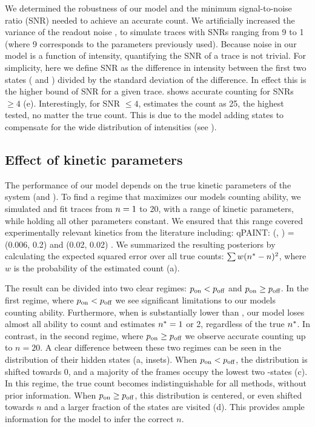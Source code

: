 We determined the robustness of our model and the minimum signal-to-noise ratio 
(SNR) needed to achieve an accurate count.
	We artificially increased the variance of the readout noise \camvar, 
	to simulate traces with SNRs ranging from 9 to 1 (where 9 
	corresponds to the parameters previously used).
	Because noise in our model is a function of intensity, quantifying the SNR of a trace 
	is not trivial. 
	For simplicity, here we define SNR as the difference in intensity between 
	the first two states ( and ) divided by the standard deviation of the difference. 
	In effect this is the higher bound of SNR for a given trace. 
	\ours shows accurate counting for SNRs $\geq 4$ (e). 
	Interestingly, for  SNR $\leq 4$, \ours estimates the count as 25, 
	the highest \n tested, no matter the true count. 
	This is due to the model adding states to compensate for the wide distribution of intensities  
	(see ).

\subsection{Effect of kinetic parameters}
The performance of our model depends on the true kinetic parameters of the system (\pon and \poff).
%
	To find a regime that maximizes our models counting ability, we simulated and fit traces 
	from $n=1$ to 20, with a range of kinetic parameters, 
	while holding all other parameters constant.
	We ensured that this range covered experimentally relevant kinetics from the literature including:
	qPAINT: (\pon, \poff) = (0.006, 0.2) \cite{jungmann_2016} and \lbfcs (0.02, 0.02) \cite{stein_2021}. 
	We summarized the resulting posteriors by calculating the expected squared error over all true counts: 
	$\sum w(n^* - n)^2$, where $w$ is the probability of the estimated count \n 
	(a).

The result can be divided into two clear regimes: $p_\text{on} < p_\text{off}$ and $p_\text{on} \geq p_\text{off}$.
	In the first regime, where $p_\text{on} < p_\text{off}$ we see significant limitations to our models counting ability.
	Furthermore, when \pon is substantially lower than \poff, our model loses almost 
	all ability to count and estimates $n^*=1$ or 2, regardless of the true $n^*$.
	In contrast, in the second regime, where $p_\text{on} \geq p_\text{off}$ we observe 
	accurate counting up to $n=20$.
	A clear difference between these two regimes can be seen in the distribution 
	of their hidden states \z{} (a, insets).
	When $p_\text{on} < p_\text{off}$, the distribution is shifted towards 0, and a majority 
	of the frames occupy the lowest two \z{}-states (c). 
	In this regime, the true count becomes indistinguishable for all methods, without prior information. 
	When $p_\text{on} \geq p_\text{off}$, this distribution is centered, or even shifted towards $n$ 
	and a larger fraction of the states are visited (d). 
	This provides ample information for the model to infer the correct $n$.
	
